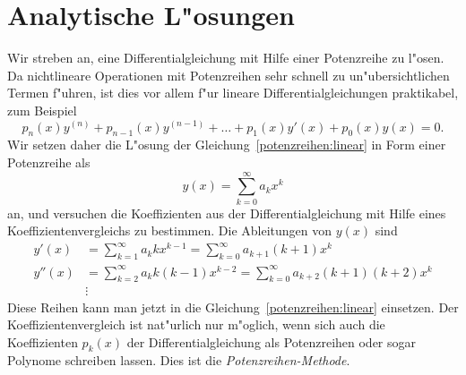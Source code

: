 \section{Analytische L"osungen
\label{section:potenzreihen:analytisch}}
Wir streben an, eine Differentialgleichung mit Hilfe einer Potenzreihe
zu l"osen.
Da nichtlineare Operationen mit Potenzreihen sehr schnell zu un"ubersichtlichen
Termen f"uhren, ist dies vor allem f"ur lineare Differentialgleichungen
praktikabel, zum Beispiel
\begin{equation}
p_n(x)y^{(n)}
+
p_{n-1}(x)y^{(n-1)}
+\dots+
p_1(x)y'(x) + p_0(x)y(x)=0.
\label{potenzreihen:linear}
\end{equation}
Wir setzen daher die L"osung der Gleichung~\eqref{potenzreihen:linear}
in Form einer Potenzreihe als
\begin{equation}
y(x)
=
\sum_{k=0}^\infty a_kx^k
\label{potenzreihen:ansatz}
\end{equation}
an, und versuchen die Koeffizienten aus der Differentialgleichung mit
Hilfe eines Koeffizientenvergleichs zu bestimmen.
Die Ableitungen von $y(x)$ sind
\begin{equation}
\begin{aligned}
y'(x)
&=
\sum_{k=1}^\infty a_kkx^{k-1}
=
\sum_{k=0}^\infty a_{k+1}(k+1)x^k
\\
y''(x)
&=
\sum_{k=2}^\infty a_kk(k-1)x^{k-2}
=
\sum_{k=0}^\infty a_{k+2}(k+1)(k+2)x^k 
\\
&\vdots
\end{aligned}
\label{potenzreihen:ableitungen}
\end{equation}
Diese Reihen kann man jetzt in die Gleichung~\eqref{potenzreihen:linear}
einsetzen.
Der Koeffizientenvergleich ist nat"urlich nur m"oglich, wenn sich auch
die Koeffizienten $p_k(x)$ der Differentialgleichung als Potenzreihen
oder sogar Polynome schreiben lassen.
Dies ist die {\em Potenzreihen-Methode}.
%

